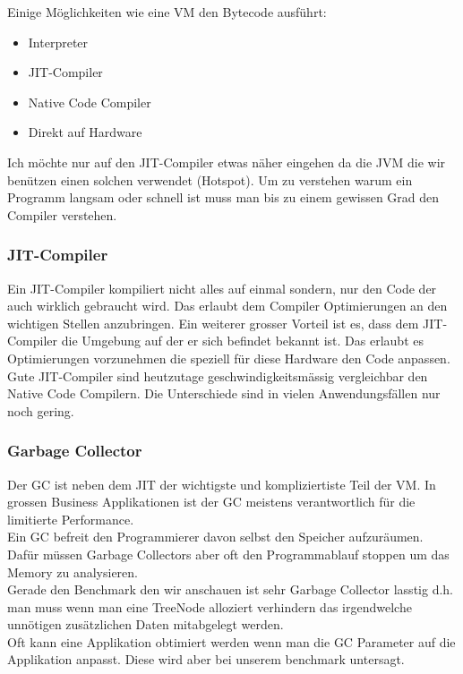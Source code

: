 \documentclass{fancydocument}
\begin{document}
Einige Möglichkeiten wie eine VM den Bytecode ausführt:


\begin{itemize}
\item Interpreter
\item JIT-Compiler
\item Native Code Compiler
\item Direkt auf Hardware
\end{itemize}

Ich m\"ochte nur auf den JIT-Compiler etwas n\"aher eingehen da die JVM
die wir ben\"utzen einen solchen verwendet (Hotspot). Um zu verstehen warum ein
Programm langsam oder schnell ist muss man bis zu einem gewissen Grad
den Compiler verstehen.

\subsubsection{JIT-Compiler}

Ein JIT-Compiler kompiliert nicht alles auf einmal sondern, nur den
Code der auch wirklich gebraucht wird. Das erlaubt dem Compiler
Optimierungen an den wichtigen Stellen anzubringen. Ein weiterer
grosser Vorteil ist es, dass dem JIT-Compiler die Umgebung auf der er
sich befindet bekannt ist. Das erlaubt es Optimierungen vorzunehmen
die speziell für diese Hardware den Code anpassen.
\\
Gute JIT-Compiler sind heutzutage geschwindigkeitsmässig vergleichbar den Native Code Compilern. Die Unterschiede sind in vielen
Anwendungsf\"allen nur noch gering.

\subsubsection{Garbage Collector}

Der GC ist neben dem JIT der wichtigste und kompliziertiste Teil der
VM. In grossen Business Applikationen ist der GC meistens
verantwortlich f\"ur die limitierte Performance.
\\
Ein GC befreit den Programmierer davon selbst den Speicher
aufzur\"aumen. Daf\"ur m\"ussen Garbage Collectors aber oft den
Programmablauf stoppen um das Memory zu analysieren.
\\
Gerade den Benchmark den wir anschauen ist sehr Garbage Collector
lasstig d.h. man muss wenn man eine TreeNode alloziert verhindern das
irgendwelche unnötigen zus\"atzlichen Daten mitabgelegt werden.
\\
Oft kann eine Applikation obtimiert werden wenn man die GC Parameter
auf die Applikation anpasst. Diese wird aber bei unserem benchmark
untersagt.
\end{document}
